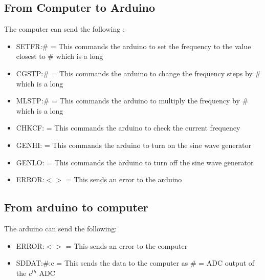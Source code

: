 \documentclass [a4paper,11pt]{article}
\begin{document}
\subsection{From Computer to Arduino}
The computer can send the following :
\begin{itemize}
\item SETFR:\# = This commands the arduino to set the frequency to the value closest to \# which is a long
\item CGSTP:\# = This commands the arduino to change the frequency steps by \# which is a long
\item MLSTP:\# = This commands the arduino to multiply the frequency by \# which is a long
\item CHKCF: = This commands the arduino to check the current frequency
\item GENHI: = This commands the arduino to turn on the sine wave generator
\item GENLO: = This commands the arduino to turn off the sine wave generator
\item ERROR:$<>$ = This sends an error to the arduino
\end{itemize}
\subsection{From arduino to computer}
The arduino can send the following:
\begin{itemize}
\item ERROR:$<>$ = This sends an error to the computer
\item SDDAT:\#:c =  This sends the data to the computer as \# = ADC output of the $c^{th}$ ADC
\end{itemize}
\end{document}
